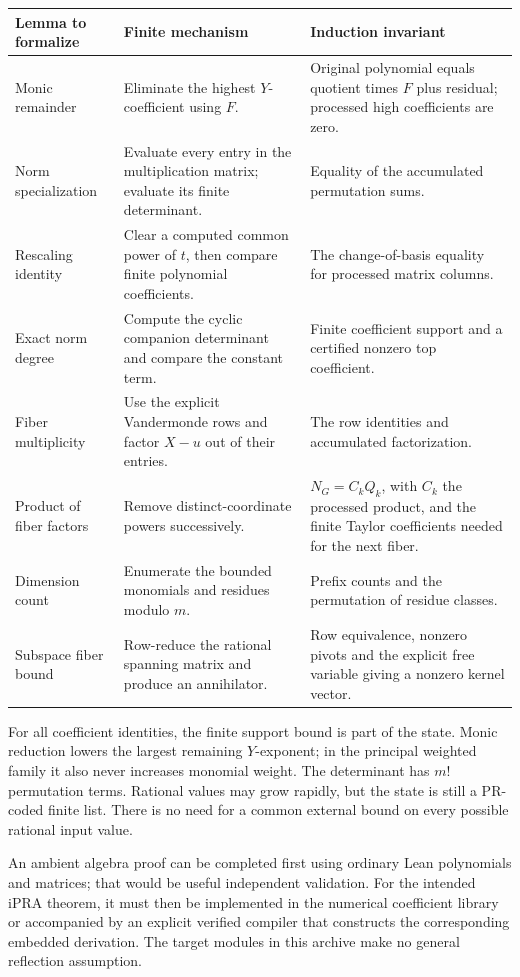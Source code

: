 \begin{longtable}{P{.28\linewidth}P{.34\linewidth}P{.29\linewidth}}
\toprule
Lemma to formalize & Finite mechanism & Induction invariant\\
\midrule\endhead
Monic remainder & Eliminate the highest \(Y\)-coefficient using \(F\).
& Original polynomial equals quotient times \(F\) plus residual;
processed high coefficients are zero.\\[3pt]
Norm specialization & Evaluate every entry in the multiplication matrix;
evaluate its finite determinant. & Equality of the accumulated
permutation sums.\\[3pt]
Rescaling identity & Clear a computed common power of \(t\), then compare
finite polynomial coefficients. & The change-of-basis equality for
processed matrix columns.\\[3pt]
Exact norm degree & Compute the cyclic companion determinant and compare
the constant term. & Finite coefficient support and a certified nonzero
top coefficient.\\[3pt]
Fiber multiplicity & Use the explicit Vandermonde rows and factor
\(X-u\) out of their entries. & The row identities and accumulated
factorization.\\[3pt]
Product of fiber factors & Remove distinct-coordinate powers successively.
& \(N_G=C_kQ_k\), with \(C_k\) the processed product, and the finite
Taylor coefficients needed for the next fiber.\\[3pt]
Dimension count & Enumerate the bounded monomials and residues modulo \(m\).
& Prefix counts and the permutation of residue classes.\\[3pt]
Subspace fiber bound & Row-reduce the rational spanning matrix and produce
an annihilator. & Row equivalence, nonzero pivots and the explicit free
variable giving a nonzero kernel vector.\\
\bottomrule
\end{longtable}

For all coefficient identities, the finite support bound is part of the
state. Monic reduction lowers the largest remaining \(Y\)-exponent; in
the principal weighted family it also never increases monomial weight.
The determinant has \(m!\) permutation terms. Rational values may grow
rapidly, but the state is still a PR-coded finite list. There is no need
for a common external bound on every possible rational input value.

An ambient algebra proof can be completed first using ordinary Lean
polynomials and matrices; that would be useful independent validation.
For the intended iPRA theorem, it must then be implemented in the numerical
coefficient library or accompanied by an explicit verified compiler that
constructs the corresponding embedded derivation. The target modules in
this archive make no general reflection assumption.

